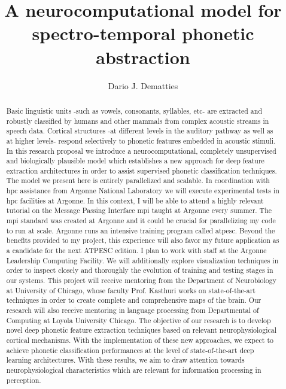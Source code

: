 \documentclass[11pt,a4paper]{article}
\title{A neurocomputational model for spectro-temporal phonetic abstraction}
\author[1]{Dario J. Dematties}
\affil[1]{Instituto de Ingeniería Biomédica, Facultad de Ingeniería, Universidad de Buenos Aires,
Ciudad Autonoma de Buenos Aires, Buenos Aires, Argentina}
\begin{document}


\maketitle

\begin{abstract}
Basic linguistic units -such as vowels, consonants, syllables, etc-
are extracted and robustly classified by humans and other mammals
from complex acoustic streams in speech data.
Cortical structures -at different levels in the auditory pathway as well as at higher levels-
respond selectively to phonetic features embedded in acoustic stimuli.
In this research proposal we introduce a neurocomputational,
completely unsupervised and biologically plausible model
which establishes a new approach for deep feature extraction
architectures in order to assist supervised phonetic classification
techniques.
The model we present here is entirely parallelized and scalable.
In coordination with \gls{hpc} assistance from Argonne National Laboratory
we will execute experimental tests in \gls{hpc} facilities at Argonne.
In this context, I will be able to attend a highly relevant tutorial on the Message Passing Interface \gls{mpi}  taught at Argonne every summer. The \gls{mpi} standard was created at Argonne and it could be crucial for parallelizing my code to run at scale.
Argonne runs an intensive training program called \gls{atpesc}. Beyond the benefits provided to my project,
this experience will also favor my future application as a candidate
for the next ATPESC edition. 
I plan to work with staff at the Argonne Leadership Computing Facility. We will additionally explore visualization techniques
in order to inspect closely and thoroughly the evolution of
training and testing stages
in our systems.
This project will receive mentoring from the Department of Neurobiology at
University of Chicago, whose faculty Prof. Kasthuri works on state-of-the-art
techniques in order to create complete and comprehensive maps of the brain.
Our research will also receive mentoring in language processing
from Departmental of Computing at
Loyola University Chicago.
The objective of our research is to develop novel deep phonetic
feature extraction techniques based on relevant neurophysiological
cortical mechanisms.
With the implementation of these new approaches, we expect to
achieve phonetic classification performances at the level of state-of-the-art deep learning architectures. 
With these results, we aim to draw attention 
towards neurophysiological characteristics which are
relevant for information processing in perception.
\end{abstract}
\end{document}

